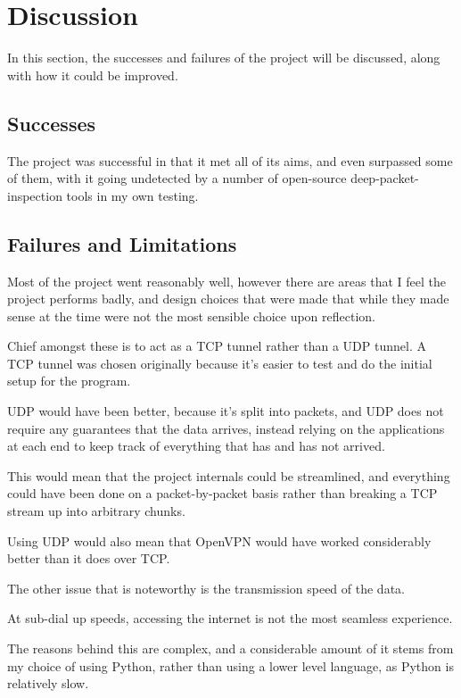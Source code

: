 \section{Discussion}
In this section, the successes and failures of the project will be discussed, along with how it could be improved.
\subsection{Successes}
The project was successful in that it met all of its aims, and even surpassed some of them, with it going undetected by a number of open-source deep-packet-inspection tools in my own testing.

\subsection{Failures and Limitations}
Most of the project went reasonably well, however there are areas that I feel the project performs badly, and design choices that were made that while they made sense at the time were not the most sensible choice upon reflection.\par
Chief amongst these is to act as a TCP tunnel rather than a UDP tunnel. A TCP tunnel was chosen originally because it's easier to test and do the initial setup for the program.\par
UDP would have been better, because it's split into packets, and UDP does not require any guarantees that the data arrives, instead relying on the applications at each end to keep track of everything that has and has not arrived.\par
This would mean that the project internals could be streamlined, and everything could have been done on a packet-by-packet basis rather than breaking a TCP stream up into arbitrary chunks.\par
Using UDP would also mean that OpenVPN would have worked considerably better than it does over TCP\@.\par
The other issue that is noteworthy is the transmission speed of the data.\par
At sub-dial up speeds, accessing the internet is not the most seamless experience.\par
The reasons behind this are complex, and a considerable amount of it stems from my choice of using Python, rather than using a lower level language, as Python is relatively slow.
